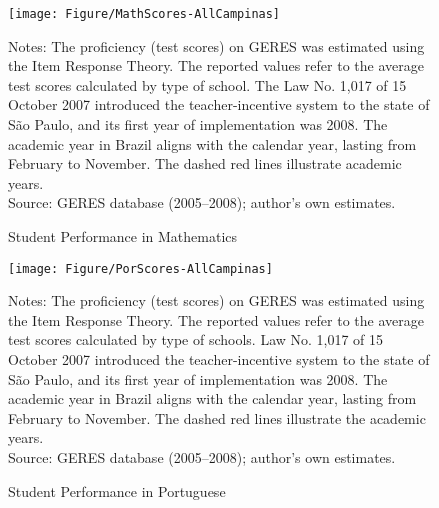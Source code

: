 \documentclass[a4paper, 12pt]{article}
\begin{document}
\begin{figure}[H]
\centering
\captionsetup{justification=centering,margin=1.5cm}
      \texttt{[image: Figure/MathScores-AllCampinas]}
       \vspace{0cm}
          \begin{minipage}{0.86\textwidth} %
{\scriptsize
Notes: The proficiency (test scores) on GERES was estimated using the Item Response Theory. The reported values refer to the average test scores calculated by type of school. The Law No. 1,017 of 15 October 2007 introduced the teacher-incentive system to the state of São Paulo, and its first year of implementation was 2008. The academic year in Brazil aligns with the calendar year, lasting from February to November. The dashed red lines illustrate academic years.  \\
Source: GERES database (2005–2008); author’s own estimates.\par}
\end{minipage}
\caption{Student Performance in Mathematics}
\label{fig:Math-RegStud}
\end{figure} 




\begin{figure}[H]
\centering
\captionsetup{justification=centering,margin=1.5cm}
      \texttt{[image: Figure/PorScores-AllCampinas]}
       \vspace{0cm}
         \begin{minipage}{0.86\textwidth} %
{\scriptsize
Notes: The proficiency (test scores) on GERES was estimated using the Item Response Theory. The reported values refer to the average test scores calculated by type of schools. Law No. 1,017 of 15 October 2007 introduced the teacher-incentive system to the state of São Paulo, and its first year of implementation was 2008. The academic year in Brazil aligns with the calendar year, lasting from February to November. The dashed red lines illustrate the academic years.  \\
Source: GERES database (2005–2008); author’s own estimates.\par}
\end{minipage}
\caption{Student Performance in Portuguese}
\label{fig:Por-RegStud}
\end{figure} 








\end{document}
